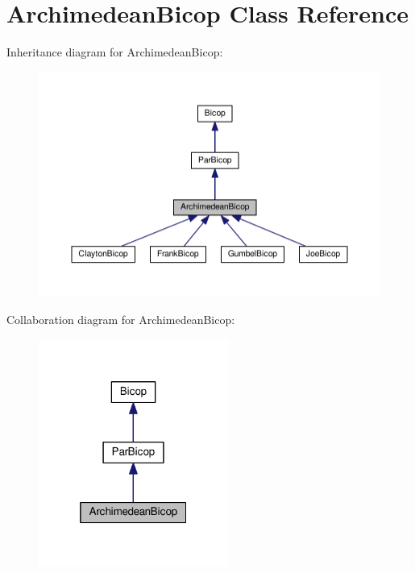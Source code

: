 \hypertarget{class_archimedean_bicop}{\section{Archimedean\+Bicop Class Reference}
\label{class_archimedean_bicop}
}


Inheritance diagram for Archimedean\+Bicop\+:
\nopagebreak
\begin{figure}[H]
\begin{center}
\leavevmode
\includegraphics[width=350pt]{class_archimedean_bicop__inherit__graph}
\end{center}
\end{figure}


Collaboration diagram for Archimedean\+Bicop\+:
\nopagebreak
\begin{figure}[H]
\begin{center}
\leavevmode
\includegraphics[width=176pt]{class_archimedean_bicop__coll__graph}
\end{center}
\end{figure}
